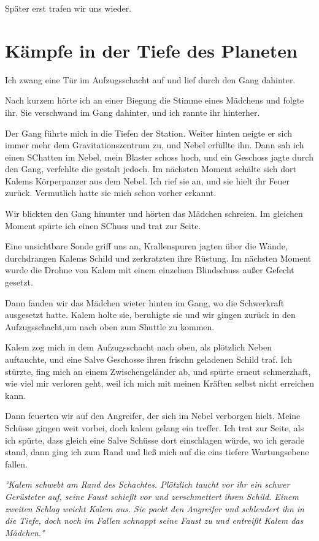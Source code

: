 \documentclass[11pt]{scrartcl}
\begin{document}
Später erst trafen wir uns wieder.

\section{Kämpfe in der Tiefe des Planeten}

Ich zwang eine Tür im Aufzugsschacht auf und lief durch den Gang
dahinter.

Nach kurzem hörte ich an einer Biegung die Stimme eines Mädchens und
folgte ihr. Sie verschwand im Gang dahinter, und ich rannte ihr
hinterher.

Der Gang führte mich in die Tiefen der Station. Weiter hinten neigte er
sich immer mehr dem Gravitationszentrum zu, und Nebel erfüllte ihn. Dann
sah ich einen SChatten im Nebel, mein Blaster schoss hoch, und ein
Geschoss jagte durch den Gang, verfehlte die gestalt jedoch. Im nächsten
Moment schälte sich dort Kalems Körperpanzer aus dem Nebel. Ich rief sie
an, und sie hielt ihr Feuer zurück. Vermutlich hatte sie mich schon
vorher erkannt.

Wir blickten den Gang hinunter und hörten das Mädchen schreien. Im
gleichen Moment spürte ich einen SChuss und trat zur Seite.

Eine unsichtbare Sonde griff uns an, Krallenspuren jagten über die
Wände, durchdrangen Kalems Schild und zerkratzten ihre Rüstung. Im
nächsten Moment wurde die Drohne von Kalem mit einem einzelnen
Blindschuss außer Gefecht gesetzt.

Dann fanden wir das Mädchen wieter hinten im Gang, wo die Schwerkraft
ausgesetzt hatte. Kalem holte sie, beruhigte sie und wir gingen zurück
in den Aufzugsschacht,um nach oben zum Shuttle zu kommen.

Kalem zog mich in dem Aufzugsschacht nach oben, als plötzlich Neben
auftauchte, und eine Salve Geschosse ihren frischn geladenen Schild
traf. Ich stürzte, fing mich an einem Zwischengeländer ab, und spürte
erneut schmerzhaft, wie viel mir verloren geht, weil ich mich mit meinen
Kräften selbst nicht erreichen kann.

Dann feuerten wir auf den Angreifer, der sich im Nebel verborgen hielt.
Meine Schüsse gingen weit vorbei, doch kalem gelang ein treffer. Ich
trat zur Seite, als ich spürte, dass gleich eine Salve Schüsse dort
einschlagen würde, wo ich gerade stand, dann ging ich zum Rand und ließ
mich auf die eins tiefere Wartungsebene fallen.

\emph{°Kalem schwebt am Rand des Schachtes. Plötzlich taucht vor ihr ein
schwer Gerüsteter auf, seine Faust schießt vor und zerschmettert ihren
Schild. Einem zweiten Schlag weicht Kalem aus. Sie packt den Angreifer
und schleudert ihn in die Tiefe, doch noch im Fallen schnappt seine
Faust zu und entreißt Kalem das Mädchen.°}
\end{document}
